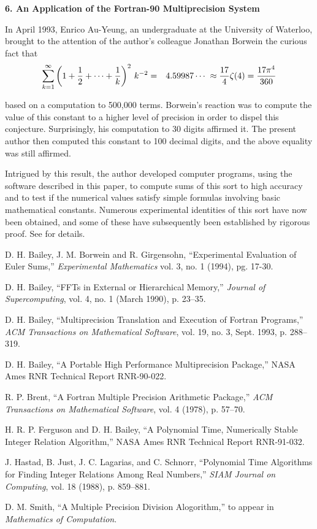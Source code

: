 \vspace{2ex} \noindent
{\bf 6. An Application of the Fortran-90 Multiprecision System}

In April 1993, Enrico Au-Yeung, an undergraduate at the University of
Waterloo, brought to the attention of the author's colleague Jonathan
Borwein the curious fact that
\begin{eqnarray*}
\sum_{k=1}^\infty \left(1 + {1 \over 2} + \cdots + {1 \over k}\right)^2
  \, k^{-2} &=& 4.59987 \cdots \;
  \approx \frac{17}{4} \zeta(4) = \frac{17 \pi^4}{360}
\end{eqnarray*}

\noindent
based on a computation to 500,000 terms.  Borwein's reaction was to
compute the value of this constant to a higher level of precision in
order to dispel this conjecture.  Surprisingly, his computation to 30
digits affirmed it.  The present author then computed this constant to
100 decimal digits, and the above equality was still affirmed.  

Intrigued by this result, the author developed computer programs,
using the software described in this paper, to compute sums of this
sort to high accuracy and to test if the numerical values satisfy
simple formulas involving basic mathematical constants.  Numerous
experimental identities of this sort have now been obtained, and some
of these have subsequently been established by rigorous proof.  See
\cite{dhb-eulsum} for details.

\begin{thebibliography}{10}

 D. H. Bailey, J. M. Borwein and R. Girgensohn,
``Experimental Evaluation of Euler Sums,'' {\sl Experimental
Mathematics} vol. 3, no. 1 (1994), pg. 17-30.

  D. H. Bailey, ``FFTs in External or Hierarchical
Memory,'' {\sl Journal of Supercomputing}, vol. 4, no. 1 (March 1990),
p. 23--35.

  D. H. Bailey, ``Multiprecision Translation and
Execution of Fortran Programs,'' {\sl ACM Transactions on Mathematical
Software}, vol. 19, no. 3, Sept. 1993, p. 288--319.

 D. H. Bailey, ``A Portable High Performance
Multiprecision Package,'' NASA Ames RNR Technical Report RNR-90-022.

 R. P. Brent, ``A Fortran Multiple Precision
Arithmetic Package,'' {\sl ACM Transactions on Mathematical Software},
vol. 4 (1978), p. 57--70.

 H. R. P. Ferguson and D. H. Bailey, ``A Polynomial
Time, Numerically Stable Integer Relation Algorithm,'' NASA Ames RNR
Technical Report RNR-91-032.

 J. Hastad, B. Just, J. C. Lagarias, and C. Schnorr,
``Polynomial Time Algorithms for Finding Integer Relations Among Real
Numbers,'' {\sl SIAM Journal on Computing}, vol. 18 (1988),
p. 859--881.

 D. M. Smith, ``A Multiple Precision Division
Alogorithm,'' to appear in {\sl Mathematics of Computation}.

\end{thebibliography}


